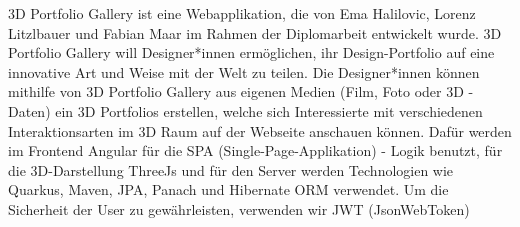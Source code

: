 3D Portfolio Gallery ist eine Webapplikation, die von Ema Halilovic, Lorenz Litzlbauer und Fabian Maar im Rahmen der Diplomarbeit entwickelt wurde. 3D Portfolio Gallery will Designer*innen ermöglichen, ihr Design-Portfolio auf eine innovative Art und Weise mit der Welt zu teilen. Die Designer*innen können mithilfe von 3D Portfolio Gallery aus eigenen Medien (Film, Foto oder 3D - Daten) ein 3D Portfolios erstellen, welche sich Interessierte mit verschiedenen Interaktionsarten im 3D Raum auf der Webseite anschauen können.  
Dafür werden im Frontend Angular für die SPA (Single-Page-Applikation) - Logik benutzt, für die 3D-Darstellung ThreeJs und für den Server werden Technologien wie Quarkus, Maven, JPA, Panach und  Hibernate ORM verwendet.
Um die Sicherheit der User zu gewährleisten, verwenden wir JWT (JsonWebToken)